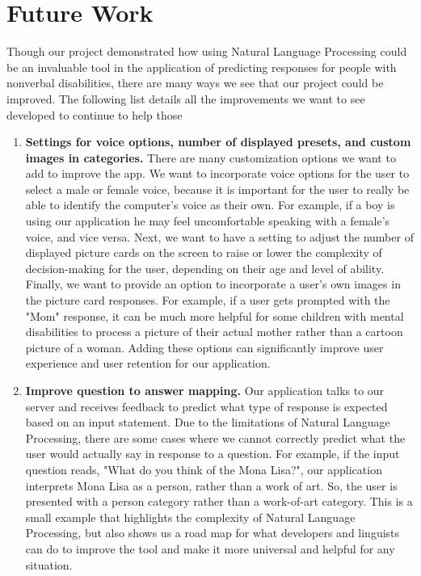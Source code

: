 \section{Future Work}
Though our project demonstrated how using Natural Language Processing could be an invaluable tool in the application of predicting responses for people with nonverbal disabilities, there are many ways we see that our project could be improved. The following list details all the improvements we want to see developed to continue to help those 
\begin{enumerate}
	\item \textbf{Settings for voice options, number of displayed presets, and custom images in categories.}  There are many customization options we want to add to improve the app. We want to incorporate voice options for the user to select a male or female voice, because it is important for the user to really be able to identify the computer's voice as their own. For example, if a boy is using our application he may feel uncomfortable speaking with a female's voice, and vice versa. Next, we want to have a setting to adjust the number of displayed picture cards on the screen to raise or lower the complexity of decision-making for the user, depending on their age and level of ability. Finally, we want to provide an option to incorporate a user's own images in the picture card responses. For example, if a user gets prompted with the "Mom" response, it can be much more helpful for some children with mental disabilities to process a picture of their actual mother rather than a cartoon picture of a woman. Adding these options can significantly improve user experience and user retention for our application.
	\item \textbf{Improve question to answer mapping.} Our application talks to our server and receives feedback to predict what type of response is expected based on an input statement. Due to the limitations of Natural Language Processing, there are some cases where we cannot correctly predict what the user would actually say in response to a question. For example, if the input question reads, "What do you think of the Mona Lisa?", our application interprets Mona Lisa as a person, rather than a work of art. So, the user is presented with a person category rather than a work-of-art category. This is a small example that highlights the complexity of Natural Language Processing, but also shows us a road map for what developers and linguists can do to improve the tool and make it more universal and helpful for any situation.

\end{enumerate}
